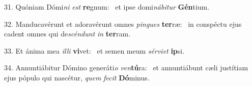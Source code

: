 31. Quóniam Dómi\textit{ni} \textit{est} \textbf{re}gnum: \ast\  et ipse domi\textit{ná}\textit{bi}\textit{tur} \textbf{Gén}tium.\

32. Manducavérunt et adoravérunt omnes \textit{pin}\textit{gues} \textbf{ter}ræ: \ast\  in conspéctu ejus cadent omnes qui de\textit{scén}\textit{dunt} \textit{in} \textbf{ter}ram.\

33. Et ánima mea \textit{il}\textit{li} \textbf{vi}vet: \ast\  et semen meum \textit{sér}\textit{vi}\textit{et} \textbf{ip}si.\

34. Annuntiábitur Dómino generáti\textit{o} \textit{ven}\textbf{tú}ra: \ast\  et annuntiábunt cæli justítiam ejus pópulo qui nascétur, \textit{quem} \textit{fe}\textit{cit} \textbf{Dó}minus.\

